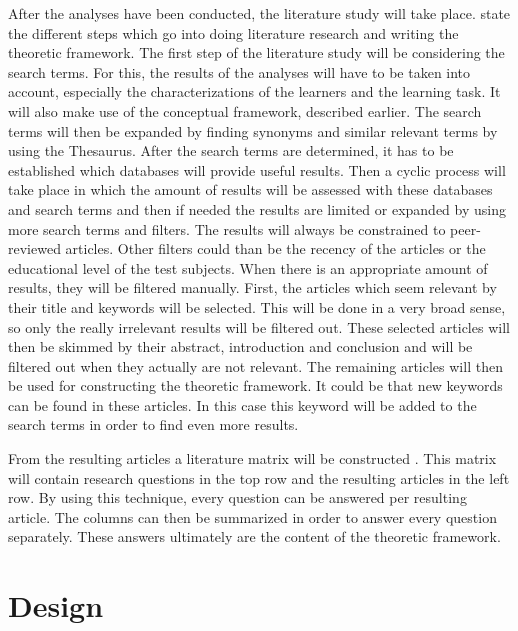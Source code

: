 \documentclass[12pt]{report} %
\begin{document}
After the analyses have been conducted, the literature study will take place.  state the different steps which go into doing literature research and writing the theoretic framework. The first step of the literature study will be considering the search terms. For this, the results of the analyses will have to be taken into account, especially the characterizations of the learners and the learning task. It will also make use of the conceptual framework, described earlier. The search terms will then be expanded by finding synonyms and similar relevant terms by using the Thesaurus. After the search terms are determined, it has to be established which databases will provide useful results. Then a cyclic process will take place in which the amount of results will be assessed with these databases and search terms and then if needed the results are limited or expanded by using more search terms and filters. The results will always be constrained to peer-reviewed articles. Other filters could than be the recency of the articles or the educational level of the test subjects. When there is an appropriate amount of results, they will be filtered manually. First, the articles which seem relevant by their title and keywords will be selected. This will be done in a very broad sense, so only the really irrelevant results will be filtered out. These selected articles will then be skimmed by their abstract, introduction and conclusion and will be filtered out when they actually are not relevant. The remaining articles will then be used for constructing the theoretic framework. It could be that new keywords can be found in these articles. In this case this keyword will be added to the search terms in order to find even more results.

From the resulting articles a literature matrix will be constructed \cite{lerencomm}. This matrix will contain research questions in the top row and the resulting articles in the left row. By using this technique, every question can be answered per resulting article. The columns can then be summarized in order to answer every question separately. These answers ultimately are the content of the theoretic framework.

\section{Design}
\end{document}
